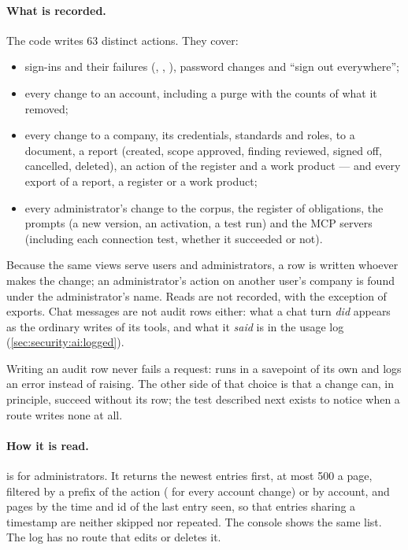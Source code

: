 \paragraph{What is recorded.} The code writes 63 distinct actions. They cover:

\begin{itemize}
  \item sign-ins and their failures (, ,
    ), password changes and \enquote{sign out everywhere};
  \item every change to an account, including a purge with the counts of what it removed;
  \item every change to a company, its credentials, standards and roles, to a document, a
    report (created, scope approved, finding reviewed, signed off, cancelled, deleted), an
    action of the register and a work product --- and every export of a report, a register
    or a work product;
  \item every administrator's change to the corpus, the register of obligations, the
    prompts (a new version, an activation, a test run) and the MCP servers (including each
    connection test, whether it succeeded or not).
\end{itemize}

Because the same views serve users and administrators, a row is written whoever makes the
change; an administrator's action on another user's company is found under the
administrator's name. Reads are not recorded, with the exception of exports. Chat messages
are not audit rows either: what a chat turn \emph{did} appears as the ordinary writes of its
tools, and what it \emph{said} is in the usage log (\cref{sec:security:ai:logged}).

Writing an audit row never fails a request:  runs in a savepoint of its own and
logs an error instead of raising. The other side of that choice is that a change can, in
principle, succeed without its row; the test described next exists to notice when a route
writes none at all.

\paragraph{How it is read.}  is for administrators. It returns the
newest entries first, at most 500 a page, filtered by a prefix of the action
( for every account change) or by account, and pages by the time and id of the
last entry seen, so that entries sharing a timestamp are neither skipped nor repeated. The
console shows the same list. The log has no route that edits or deletes it.


